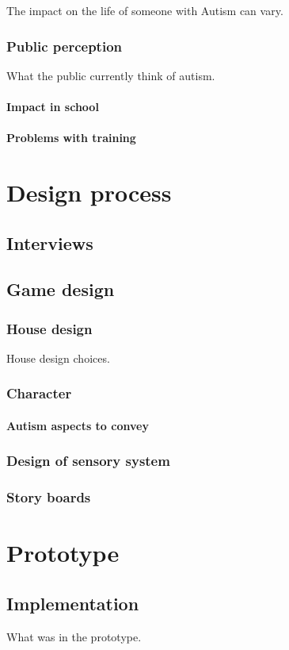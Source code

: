 \documentclass[11pt]{report}
\begin{document}
The impact on the life of someone with Autism can vary. 

\subsection{Public perception}
What the public currently think of autism.
\subsubsection{Impact in school}
\subsubsection{Problems with training}

\chapter{Design process}
\section{Interviews}

\section{Game design}
\subsection{House design}
House design choices. 
\subsection{Character}
\subsubsection{Autism aspects to convey}
\subsection{Design of sensory system}
\subsection{Story boards}

\chapter{Prototype}

\section{Implementation}
What was in the prototype.
\end{document}
